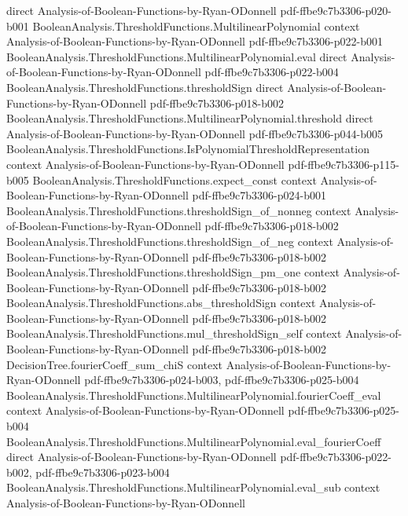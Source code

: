 \begin{theorem}
  {direct}
  {Analysis-of-Boolean-Functions-by-Ryan-ODonnell}
  {pdf-ffbe9c7b3306-p020-b001}
\proofstep
  {BooleanAnalysis.ThresholdFunctions.MultilinearPolynomial}
  {context}
  {Analysis-of-Boolean-Functions-by-Ryan-ODonnell}
  {pdf-ffbe9c7b3306-p022-b001}
\proofstep
  {BooleanAnalysis.ThresholdFunctions.MultilinearPolynomial.eval}
  {direct}
  {Analysis-of-Boolean-Functions-by-Ryan-ODonnell}
  {pdf-ffbe9c7b3306-p022-b004}
\proofstep
  {BooleanAnalysis.ThresholdFunctions.thresholdSign}
  {direct}
  {Analysis-of-Boolean-Functions-by-Ryan-ODonnell}
  {pdf-ffbe9c7b3306-p018-b002}
\proofstep
  {BooleanAnalysis.ThresholdFunctions.MultilinearPolynomial.threshold}
  {direct}
  {Analysis-of-Boolean-Functions-by-Ryan-ODonnell}
  {pdf-ffbe9c7b3306-p044-b005}
\proofstep
  {BooleanAnalysis.ThresholdFunctions.IsPolynomialThresholdRepresentation}
  {context}
  {Analysis-of-Boolean-Functions-by-Ryan-ODonnell}
  {pdf-ffbe9c7b3306-p115-b005}
\proofstep
  {BooleanAnalysis.ThresholdFunctions.expect_const}
  {context}
  {Analysis-of-Boolean-Functions-by-Ryan-ODonnell}
  {pdf-ffbe9c7b3306-p024-b001}
\proofstep
  {BooleanAnalysis.ThresholdFunctions.thresholdSign_of_nonneg}
  {context}
  {Analysis-of-Boolean-Functions-by-Ryan-ODonnell}
  {pdf-ffbe9c7b3306-p018-b002}
\proofstep
  {BooleanAnalysis.ThresholdFunctions.thresholdSign_of_neg}
  {context}
  {Analysis-of-Boolean-Functions-by-Ryan-ODonnell}
  {pdf-ffbe9c7b3306-p018-b002}
\proofstep
  {BooleanAnalysis.ThresholdFunctions.thresholdSign_pm_one}
  {context}
  {Analysis-of-Boolean-Functions-by-Ryan-ODonnell}
  {pdf-ffbe9c7b3306-p018-b002}
\proofstep
  {BooleanAnalysis.ThresholdFunctions.abs_thresholdSign}
  {context}
  {Analysis-of-Boolean-Functions-by-Ryan-ODonnell}
  {pdf-ffbe9c7b3306-p018-b002}
\proofstep
  {BooleanAnalysis.ThresholdFunctions.mul_thresholdSign_self}
  {context}
  {Analysis-of-Boolean-Functions-by-Ryan-ODonnell}
  {pdf-ffbe9c7b3306-p018-b002}
\proofstep
  {DecisionTree.fourierCoeff_sum_chiS}
  {context}
  {Analysis-of-Boolean-Functions-by-Ryan-ODonnell}
  {pdf-ffbe9c7b3306-p024-b003,
    pdf-ffbe9c7b3306-p025-b004}
\proofstep
  {BooleanAnalysis.ThresholdFunctions.MultilinearPolynomial.fourierCoeff_eval}
  {context}
  {Analysis-of-Boolean-Functions-by-Ryan-ODonnell}
  {pdf-ffbe9c7b3306-p025-b004}
\proofstep
  {BooleanAnalysis.ThresholdFunctions.MultilinearPolynomial.eval_fourierCoeff}
  {direct}
  {Analysis-of-Boolean-Functions-by-Ryan-ODonnell}
  {pdf-ffbe9c7b3306-p022-b002,
    pdf-ffbe9c7b3306-p023-b004}
\proofstep
  {BooleanAnalysis.ThresholdFunctions.MultilinearPolynomial.eval_sub}
  {context}
  {Analysis-of-Boolean-Functions-by-Ryan-ODonnell}

\end{theorem}
